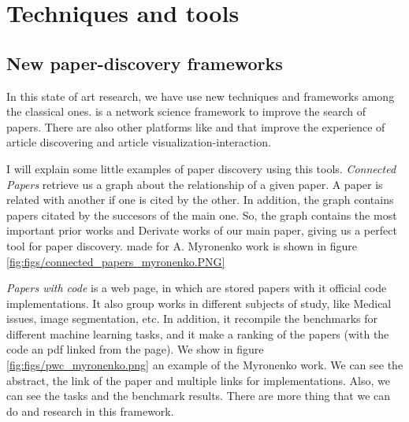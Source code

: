 \chapter{Techniques and tools}
\label{chapter:tools}

\section{}

\section{New paper-discovery frameworks}
\label{section:papers_discovery}

In this state of art research, we have use new techniques and frameworks among the classical ones.  is a network science framework to improve the search of papers. There are also other platforms like  and  that improve the experience of article discovering and article visualization-interaction.
 
I will explain some little examples of paper discovery using this tools. \textit{Connected Papers} retrieve us a graph about the relationship of a given paper. A paper is related with another if one is cited by the other. In addition, the graph contains papers citated by the succesors of the main one. So, the graph contains the most important prior works and Derivate works of our main paper, giving us a perfect tool for paper discovery.  made for A. Myronenko work \cite{myronenko20183d} is shown in figure \ref{fig:figs/connected_papers_myronenko.PNG} 
 

\textit{Papers with code} is a web page, in which are stored papers with it official code implementations. It also group works in different subjects of study, like Medical issues, image segmentation, etc. In addition, it recompile the benchmarks for different machine learning tasks, and it make a ranking of the papers (with the code an pdf linked from the page). We show in figure \ref{fig:figs/pwc_myronenko.png} an example of the Myronenko work. We can see the abstract, the link of the paper and multiple links for implementations. Also, we can see the tasks and the benchmark results. There are more thing that we can do and research in this framework. 

